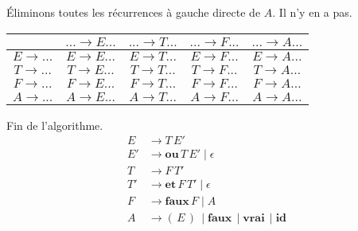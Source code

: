 \documentclass[class=article]{standalone}
\begin{document}
Éliminons toutes les récurrences à gauche directe de $A$. Il n'y en a pas.
\begin{center}
    \begin{tabular}{c|c|c|c|c|}
        \cellcolor[HTML]{FFFFFF}                     & 
        \cellcolor[HTML]{FFFFFF} $... \rightarrow E...$ &
        \cellcolor[HTML]{FFFFFF} $... \rightarrow T...$ & 
        \cellcolor[HTML]{FFFFFF} $... \rightarrow F...$ & 
        \cellcolor[HTML]{FFFFFF} $... \rightarrow A...$ \\
    \hline
        \cellcolor[HTML]{FFFFFF} $E \rightarrow ...$ & 
        \cellcolor[HTML]{FF0000} $E \rightarrow E...$ & 
        \cellcolor[HTML]{ABFF00} $E \rightarrow T...$ & 
        \cellcolor[HTML]{ABFF00} $E \rightarrow F...$ & 
        \cellcolor[HTML]{ABFF00} $E \rightarrow A...$ \\
    \hline
        \cellcolor[HTML]{FFFFFF} $T \rightarrow ...$ & 
        \cellcolor[HTML]{FF0000} $T \rightarrow E...$ & 
        \cellcolor[HTML]{FF0000} $T \rightarrow T...$ & 
        \cellcolor[HTML]{ABFF00} $T \rightarrow F...$ &
        \cellcolor[HTML]{ABFF00} $T \rightarrow A...$ \\
    \hline
        \cellcolor[HTML]{FFFFFF} $F \rightarrow ...$ &
        \cellcolor[HTML]{FF0000} $F \rightarrow E...$ &
        \cellcolor[HTML]{FF0000} $F \rightarrow T...$ & 
        \cellcolor[HTML]{FF0000} $F \rightarrow F...$ & 
        \cellcolor[HTML]{ABFF00} $F \rightarrow A...$ \\
    \hline
        \cellcolor[HTML]{FFFFFF} $A \rightarrow ...$ & 
        \cellcolor[HTML]{FF0000} $A \rightarrow E...$ & 
        \cellcolor[HTML]{FF0000} $A \rightarrow T...$ & 
        \cellcolor[HTML]{FF0000} $A \rightarrow F...$ & 
        \cellcolor[HTML]{FF0000} $A \rightarrow A...$ \\
    \hline
    \end{tabular}
\end{center}

Fin de l'algorithme.
\begin{align*}
    E &\rightarrow T \, E'\\
    E'&\rightarrow \textbf{ou} \, T \, E' \mid \epsilon\\
    T &\rightarrow F \, T'\\
    T'&\rightarrow \textbf{et} \, F \, T' \mid \epsilon\\
    F &\rightarrow \textbf{faux} \, F \mid A\\
    A &\rightarrow ( \, E \, ) \, \mid \textbf{faux} \, \mid \textbf{vrai} \, \mid \textbf{id}
\end{align*}
\end{document}
